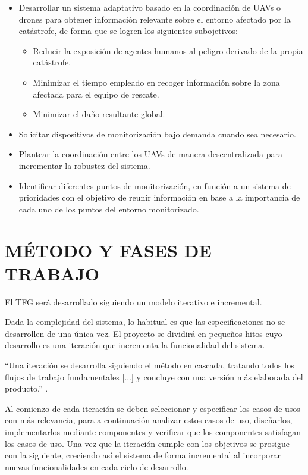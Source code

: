 \documentclass{pre-tfg}
\begin{document}
\begin{itemize}

\item Desarrollar un sistema adaptativo basado en la coordinación de UAVs o drones para obtener información relevante sobre el entorno afectado por la catástrofe, de forma que se logren los siguientes subojetivos:

\begin{itemize}
\item Reducir la exposición de agentes humanos al peligro derivado de la propia catástrofe.
\item Minimizar el tiempo empleado en recoger información sobre la zona afectada para el equipo de rescate.
\item Minimizar el daño resultante global.

\end{itemize}

\item Solicitar dispositivos de monitorización bajo demanda cuando sea necesario.

\item Plantear la coordinación entre los UAVs de manera descentralizada para incrementar la robustez del sistema.

\item Identificar diferentes puntos de monitorización, en función a un sistema de prioridades con el objetivo de reunir información en base a la importancia de cada uno de los puntos del entorno monitorizado.

\end {itemize}

\section{MÉTODO Y FASES DE TRABAJO}

El TFG será desarrollado siguiendo un modelo iterativo e incremental.

Dada la complejidad del sistema, lo habitual es que las especificaciones no se desarrollen de una única vez. El proyecto se dividirá en pequeños hitos cuyo desarrollo es una iteración que incrementa la funcionalidad del sistema.

``Una iteración se desarrolla siguiendo el método en cascada, tratando todos los flujos de trabajo fundamentales [...] y concluye con una versión más elaborada del producto.'' \cite{ingsoftware}.

Al comienzo de cada iteración se deben seleccionar y especificar los casos de usos con más relevancia, para a continuación analizar estos casos de uso, diseñarlos, implementarlos mediante componentes y verificar que los componentes satisfagan los casos de uso. Una vez que la iteración cumple con los objetivos se prosigue con la siguiente, creciendo así el sistema de forma incremental al incorporar nuevas funcionalidades en cada ciclo de desarrollo.   
\end{document}

